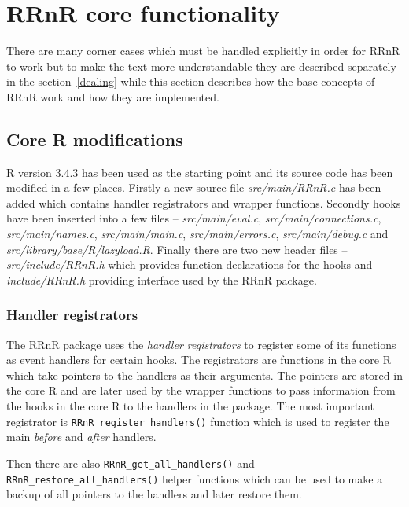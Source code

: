 \documentclass[thesis=M,english,hidelinks]{FITthesis}[2012/10/20]
\begin{document}
	\section{RRnR core functionality}
	There are many corner cases which must be handled explicitly in order for RRnR to work but to make the text more understandable they are described separately in the section~\ref{dealing} while this section describes how the base concepts of RRnR work and how they are implemented.\par

		\subsection{Core R modifications}
		R version 3.4.3 has been used as the starting point and its source code has been modified in a few places. Firstly a new source file \emph{src/main/RRnR.c} has been added which contains handler registrators and wrapper functions. Secondly hooks have been inserted into a few files -- \emph{src/main/eval.c}, \emph{src/main/connections.c}, \emph{src/main/names.c}, \emph{src/main/main.c}, \emph{src/main/errors.c}, \emph{src/main/debug.c} and \emph{src/library/base/R/lazyload.R}. Finally there are two new header files -- \emph{src/include/RRnR.h} which provides function declarations for the hooks and \emph{include/RRnR.h} providing interface used by the RRnR package.\par
		
			\subsubsection{Handler registrators}
			The RRnR package uses the \emph{handler registrators} to register some of its functions as event handlers for certain hooks. The registrators are functions in the core R which take pointers to the handlers as their arguments. The pointers are stored in the core R and are later used by the wrapper functions to pass information from the hooks in the core R to the handlers in the package. The most important registrator is \lstinline|RRnR_register_handlers()| function which is used to register the main \emph{before} and \emph{after} handlers.\par
			
			Then there are also \lstinline|RRnR_get_|\lstinline|all_handlers()| and \lstinline|RRnR_restore_all_|\allowbreak\lstinline|handlers()| helper functions which can be used to make a backup of all pointers to the handlers and later restore them.\par
			
\end{document}
